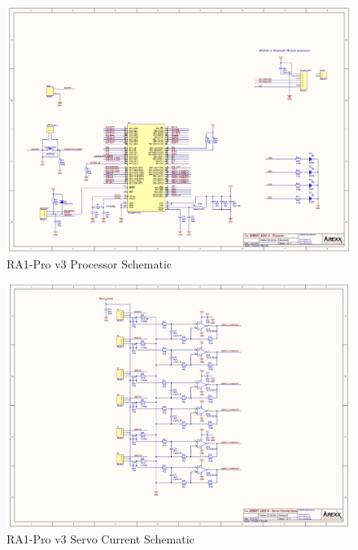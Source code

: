 \documentclass[12p,a4paper]{report}
\begin{document}
\begin{appendices}
\begin{figure}
\includegraphics[scale=0.45]{arm-processor-schematic}
\caption{RA1-Pro v3 Processor Schematic \cite{arexx}}
\label{fig:arm-processor-schematic}
\end{figure}
  	
\begin{figure}
\includegraphics[scale=0.45]{arm-servocurrent-schematic}
\caption{RA1-Pro v3 Servo Current Schematic \cite{arexx}}
\label{fig:arm-supply-schematic}
\end{figure}
  	

\end{appendices}
\end{document}
